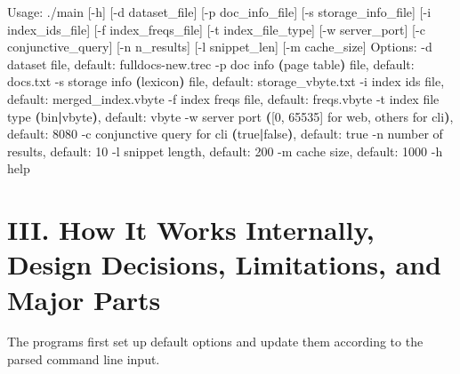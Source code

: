 \documentclass[12pt]{article}
\newenvironment{Shaded}{}{}
\newcommand{\ErrorTok}[1]{\textcolor[rgb]{1.00,0.00,0.00}{\textbf{\footnotesize #1}}}
\newcommand{\ExtensionTok}[1]{\footnotesize #1}
\newcommand{\FunctionTok}[1]{\textcolor[rgb]{0.02,0.16,0.49}{\footnotesize #1}}
\newcommand{\KeywordTok}[1]{\textcolor[rgb]{0.00,0.44,0.13}{\textbf{\footnotesize #1}}}
\newcommand{\NormalTok}[1]{\footnotesize #1}
\begin{document}
\begin{Shaded}
\begin{Highlighting}[]
\ExtensionTok{Usage:}\NormalTok{ ./main [{-}h] [{-}d dataset\_file] [{-}p doc\_info\_file] [{-}s storage\_info\_file]}
        \ExtensionTok{[{-}i}\NormalTok{ index\_ids\_file] [{-}f index\_freqs\_file] [{-}t index\_file\_type]}
        \ExtensionTok{[{-}w}\NormalTok{ server\_port] [{-}c conjunctive\_query] [{-}n n\_results] [{-}l snippet\_len]}
        \ExtensionTok{[{-}m}\NormalTok{ cache\_size]}
\ExtensionTok{Options:}
        \ExtensionTok{{-}d}\NormalTok{      dataset file, default: fulldocs{-}new.trec}
        \ExtensionTok{{-}p}\NormalTok{      doc info }\ErrorTok{(}\ExtensionTok{page}\NormalTok{ table}\KeywordTok{)} \FunctionTok{file}\NormalTok{, default: docs.txt}
        \ExtensionTok{{-}s}\NormalTok{      storage info }\ErrorTok{(}\ExtensionTok{lexicon}\KeywordTok{)} \FunctionTok{file}\NormalTok{, default: storage\_vbyte.txt}
        \ExtensionTok{{-}i}\NormalTok{      index ids file, default: merged\_index.vbyte}
        \ExtensionTok{{-}f}\NormalTok{      index freqs file, default: freqs.vbyte}
        \ExtensionTok{{-}t}\NormalTok{      index file type }\ErrorTok{(}\ExtensionTok{bin}\KeywordTok{|}\ExtensionTok{vbyte}\KeywordTok{)}\ExtensionTok{,}\NormalTok{ default: vbyte}
        \ExtensionTok{{-}w}\NormalTok{      server port }\ErrorTok{(}\ExtensionTok{[0,}\NormalTok{ 65535] for web, others for cli}\KeywordTok{)}\ExtensionTok{,}\NormalTok{ default: 8080}
        \ExtensionTok{{-}c}\NormalTok{      conjunctive query for cli }\ErrorTok{(}\FunctionTok{true}\KeywordTok{|}\FunctionTok{false}\KeywordTok{)}\ExtensionTok{,}\NormalTok{ default: true}
        \ExtensionTok{{-}n}\NormalTok{      number of results, default: 10}
        \ExtensionTok{{-}l}\NormalTok{      snippet length, default: 200}
        \ExtensionTok{{-}m}\NormalTok{      cache size, default: 1000}
        \ExtensionTok{{-}h}\NormalTok{      help}
\end{Highlighting}
\end{Shaded}

\hypertarget{iii-how-it-works-internally-design-decisions-limitations-and-major-parts}{%
\section{III. How It Works Internally, Design Decisions, Limitations,
and Major
Parts}\label{iii-how-it-works-internally-design-decisions-limitations-and-major-parts}}

The programs first set up default options and update them according to
the parsed command line input.
\end{document}
